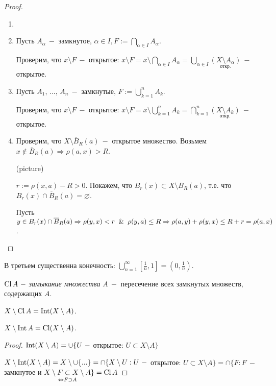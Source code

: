 \begin{proof}
    \begin{enumerate}
        \item[]
        \item Пусть $A_\alpha\ -$ замкнутое, $\alpha\in I, F:=\bigcap\limits_{\alpha\in I}A_\alpha$.

        Проверим, что $x\setminus F\ -$ открытое: $x\setminus F=x\setminus \bigcap\limits_{\alpha\in I}A_\alpha=\bigcup\limits_{\alpha\in I}\underset{\text{откр.}}{(X\setminus A_\alpha)}\ -$ открытое.
        \item Пусть $A_1$, ..., $A_n\ -$ замкнутые, $F:=\bigcup\limits_{k=1}^nA_k$.

        Проверим, что $x\setminus F\ -$ открытое: $x\setminus F=x\setminus \bigcup\limits_{k=1}^nA_k=\bigcap\limits_{k=1}^n\underset{\text{откр.}}{(X\setminus A_k)}\ -$ открытое.
        \item Проверим, что $X\setminus \overline{B}_R(a)\ -$ открытое множество. Возьмем $x\notin \overline{B}_R(a)\Rightarrow \rho (a, x)>R$.

        (picture)

        $r:=\rho(x, a)-R>0$. Покажем, что $B_r(x)\subset X\setminus \overline{B}_R(a)$, т.е. что $B_r(x)\cap \overline{B}_R(a) =\varnothing$. 
        
        Пусть $y\in B_r(x)\cap \overline{B}_R(a)\Rightarrow \rho(y, x)<r\And\rho(y, a)\leq R\Rightarrow \rho(a, y)+\rho(y, x)\leq R+r=\rho(a, x)$.
    \end{enumerate}
\end{proof}

\begin{remark}
     В третьем существенна конечность: $\bigcup\limits_{n=1}^\infty[\frac{1}{n}, 1]=(0,\frac{1}{n})$.
\end{remark}

\begin{definition}
    $\operatorname{Cl} A\ -$ \textit{замыкание множества} $A\ -$ пересечение всех замкнутых множеств, содержащих $A$.
\end{definition}

\begin{theorem}
    $X\setminus \operatorname{Cl} A=\operatorname{Int} (X\setminus A)$.

    $X\setminus \operatorname{Int} A=\operatorname{Cl} (X\setminus A)$.
\end{theorem}

\begin{proof}
    $\operatorname{Int}(X\setminus A)=\cup\{U\ - $ открытое: $U\subset X\setminus A \}$

    $X\setminus \operatorname{Int} (X \setminus A)=X \setminus \cup \{...\}=\cap \{X\setminus U: U\ - $ открытое: $U\subset X\setminus A \}=\cap \{ F : F\ - $ замкнутое и $\underset{\Leftrightarrow F \supset A}{X\setminus F \subset X\setminus A}\}=\operatorname{Cl} A$
\end{proof}

